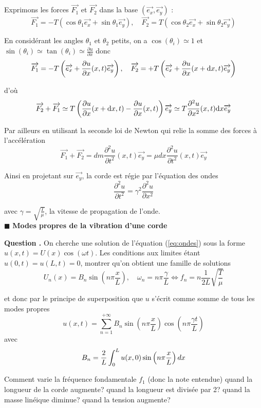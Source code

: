 \documentclass[a4,12pt]{article}
\newcounter{Nbquestion}
\newcommand*\question{%
\stepcounter{Nbquestion}%
\textbf{Question \theNbquestion. }}
\begin{document}
Exprimons les forces $\vec{F_1}$ et $\vec{F_2}$ dans la base $(\vec{e_x},\vec{e_y})$ : 
\[ 
\overrightarrow{F_1} = - T (\cos \theta_1 \overrightarrow{e_x} + \sin \theta_1 \overrightarrow{e_y}), \quad \overrightarrow{F_2} = T (\cos \theta_2 \overrightarrow{e_x} + \sin \theta_2 \overrightarrow{e_y})
\]
 
En considérant les angles $\theta_1$ et $\theta_2$ petits, on a $\cos(\theta_i)\simeq 1$ et $\sin(\theta_i)\simeq \tan(\theta_i)\simeq \frac{\partial u}{\partial x}$ donc 
\[
\overrightarrow{F_1} = - T \left(\overrightarrow{e_x} + {\partial u \over \partial x} (x,t) \overrightarrow{e_y}\right), \quad 
\overrightarrow{F_2} = + T \left(\overrightarrow{e_x} + {\partial u \over \partial x} (x+\mathrm dx,t)\overrightarrow{e_y}\right)
\]

d'où 
\[ 
\overrightarrow{F_2} + \overrightarrow{F_1} \simeq 
T \left( {\partial u \over \partial x} (x+\mathrm dx,t) - {\partial u \over \partial x} (x,t)\right) \overrightarrow{e_y}\simeq 
T {\partial ^2 u \over \partial x^2 } (x,t) \mathrm d x \overrightarrow{e_y}
\]
 
Par ailleurs en utilisant la seconde loi de Newton qui relie la somme des forces à l'accélération  
\[ 
\vec{F_1}+\vec{F_2}=dm\frac{\partial ^2u}{\partial t^2}(x,t)\vec{e_y}=\mu dx\frac{\partial ^2u}{\partial t^2}(x,t)\vec{e_y}
\]
 
Ainsi en projetant sur $\vec{e_y}$, la corde est régie par l'équation des ondes 
\begin{equation}
	\frac{\partial ^2u}{\partial t^2}=\gamma^2\frac{\partial ^2u}{\partial x^2}
	\label{eq:ondes}
\end{equation}

avec $\gamma=\sqrt{\frac{T}{\mu}}$, la vitesse de propagation de l'onde.\\

\indent $\blacksquare$ \textbf{Modes propres de la vibration d'une corde}\\


\begin{mdframed}[style=exampledefault]
\question On cherche une solution de l'équation (\ref{eq:ondes}) sous la forme $u(x,t)=U(x)\cos(\omega t)$. Les conditions aux limites étant $u(0,t)=u(L,t)=0$, montrer qu'on obtient une famille de solutions 
\[
U_n(x)=B_n\sin\left(n\pi \frac{x}{L}\right),\quad \omega_n=n\pi \frac{\gamma}{L}\Leftrightarrow f_n=n\frac{1}{2L}\sqrt{\frac{T}{\mu}}
\]

et donc par le principe de superposition que $u$ s'écrit comme somme de tous les modes propres 
\[
u(x,t)=\sum_{n=1}^{+\infty}B_n\sin\left(n\pi \frac{x}{L}\right) \cos\left(n\pi \frac{\gamma t}{L}\right)
\]
avec 
\[ 
B_n = {2 \over L} \int_{0}^{L} u(x,0) \sin \left(n \pi {x \over L}\right) dx
\]

Comment varie la fréquence fondamentale $f_1$ (donc la note entendue) quand la longueur de la corde augmente? quand la longueur est divisée par 2? quand la masse linéique diminue? quand la tension augmente?
\end{mdframed}
\end{document}
